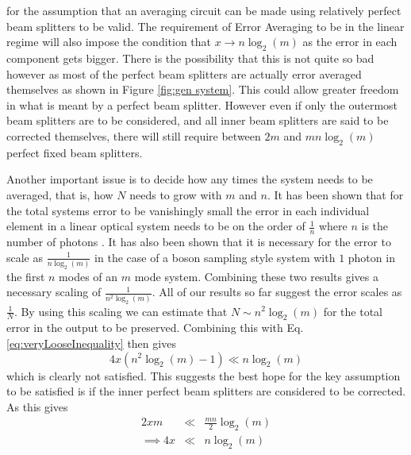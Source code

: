 \documentclass[aps,pra,twocolumn,superscriptaddress,numerical,floatfix]{revtex4-1}
\begin{document}
for the assumption that an averaging circuit can be made using relatively perfect beam splitters to be valid. The requirement of Error Averaging to be in the linear regime will also impose the condition that $x\rightarrow n\log_{2}\left(m\right)$ as the error in each component gets bigger. There is the possibility that this is not quite so bad however as most of the perfect beam splitters are actually error averaged themselves as shown in Figure \ref{fig:gen system}. This could allow greater freedom in what is meant by a perfect beam splitter. However even if only the outermost beam splitters are to be considered, and all inner beam splitters are said to be corrected themselves, there will still require between $2m$ and $mn\log_{2}\left(m\right)$ perfect fixed beam splitters.

Another important issue is to decide how any times the system needs to be averaged, that is, how $N$ needs to grow with $m$ and $n$. It has been shown that for the total systems error to be vanishingly small the error in each individual element in a linear optical system needs to be on the order of $\frac{1}{n}$ where $n$ is the number of photons \cite{arkhipov2014}. It has also been shown that it is necessary for the error to scale as $\frac{1}{n\log_{2}\left(m\right)}$ \cite{Boson} in the case of a boson sampling style system with $1$ photon in the first $n$ modes of an $m$ mode system. Combining these two results gives a necessary scaling of $\frac{1}{n^{2}\log_{2}\left(m\right)}$. All of our results so far suggest the error scales as $\frac{1}{N}$. By using this scaling we can estimate that $N\sim n^{2}\log_{2}\left(m\right)$ for the total error in the output to be preserved. Combining this with Eq. \ref{eq:veryLooseInequality} then gives
\begin{equation}
4x\left(n^{2}\log_{2}\left(m\right)-1\right)\ll n\log_{2}\left(m\right)\label{eq:LooseInequality}
\end{equation}
which is clearly not satisfied. This suggests the best hope for the key assumption to be satisfied is if the inner perfect beam splitters are considered to be corrected. As this gives
\begin{eqnarray}
2xm & \ll & \frac{mn}{2}\log_{2}\left(m\right)\nonumber \\
\implies4x & \ll & n\log_{2}\left(m\right)\label{eq:aBetterInequality}
\end{eqnarray}
\end{document}
